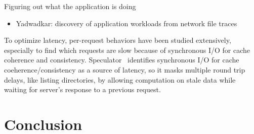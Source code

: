 \documentclass[conference]{acm_proc_article-sp} \usepackage[english]{babel}
\begin{document}
Figuring out what the application is doing \begin{itemize} \item Yadwadkar:
discovery of application workloads from network file traces \end{itemize}

To optimize latency, per-request behaviors have been studied extensively,
especially to find which requests are slow because of synchronous I/O for cache
coherence and consistency. Speculator~\cite{nightingale:sosp2005-speculator}
identifies synchronous I/O for cache coeherence/consistency as a source of
latency, so it masks multiple round trip delays, like listing directories, by
allowing computation on stale data while waiting for server's response to a
previous request. 

\section{Conclusion}


   
\end{document}
